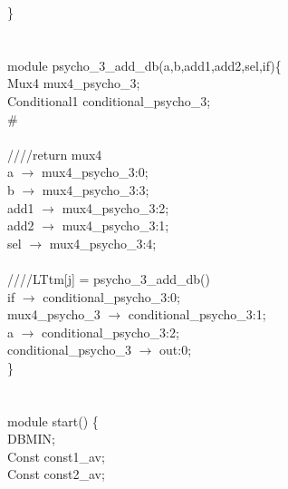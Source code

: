 \} \\
\\
\\
module psycho\_3\_add\_db(a,b,add1,add2,sel,if)\{ \\
\hspace*{2em}Mux4 mux4\_psycho\_3; \\
\hspace*{2em}Conditional1 conditional\_psycho\_3; \\
\# \\
\\
\hspace*{2em}////return mux4 \\
\hspace*{2em}a $\rightarrow$ mux4\_psycho\_3:0; \\
\hspace*{2em}b $\rightarrow$ mux4\_psycho\_3:3; \\
\hspace*{2em}add1 $\rightarrow$ mux4\_psycho\_3:2; \\
\hspace*{2em} add2 $\rightarrow$ mux4\_psycho\_3:1; \\
\hspace*{2em}sel $\rightarrow$ mux4\_psycho\_3:4; \\
   \\
   \hspace*{2em}////LTtm[j] = psycho\_3\_add\_db() \\
   \hspace*{2em}if $\rightarrow$ conditional\_psycho\_3:0; \\
   \hspace*{2em}mux4\_psycho\_3 $\rightarrow$ conditional\_psycho\_3:1; \\
   \hspace*{2em}a $\rightarrow$ conditional\_psycho\_3:2; \\
   \hspace*{2em}conditional\_psycho\_3 $\rightarrow$ out:0; \\
\} \\
\\
\\
module start() \{ \\
\hspace*{2em}DBMIN; \\
\hspace*{2em}Const const1\_av; \\
\hspace*{2em}Const const2\_av; \\
